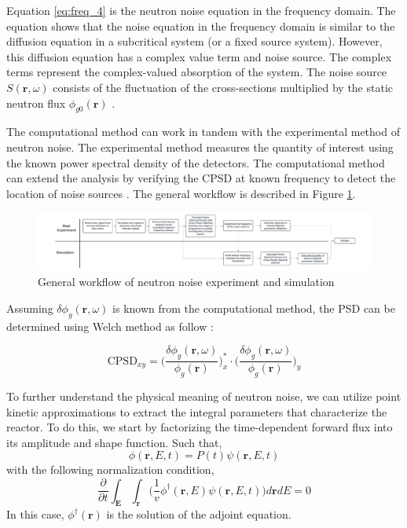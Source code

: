 Equation \ref{eq:freq_4} is the neutron noise equation in the frequency domain. The equation shows that the noise equation in the frequency domain is similar to the diffusion equation in a subcritical system (or a fixed source system). However, this diffusion equation has a complex value term and noise source. The complex terms represent the complex-valued absorption of the system. The noise source  $S (\textbf{r}, \omega)$ consists of the fluctuation of the cross-sections multiplied by the static neutron flux $\phi_{g0} (\textbf{r})$ \cite{pazsitDynamicAdjointGreen2015}. 

The computational method can work in tandem with the experimental method of neutron noise. The experimental method measures the quantity of interest using the known power spectral density of the detectors. The computational method can extend the analysis by verifying the CPSD at known frequency to detect the location of noise sources \cite{hursinModelingNoiseExperiments2023}. The general workflow is described in Figure \ref{fig:flow_diagram}.
\begin{figure}[h]
        \centering
        \includegraphics[width=\textwidth]{figures/ch1_Picture1.png}
        \caption{General workflow of neutron noise experiment and simulation}
        \label{fig:flow_diagram}
\end{figure}

Assuming $\delta \phi_g (\textbf{r},\omega)$ is known from the computational method, the PSD can be determined using Welch method as follow \cite{mylonakisCORESIMSIMULATIONS2021}:

\begin{equation}
        \text{CPSD}_{xy} = \biggl(\frac{\delta \phi_{g}(\textbf{r}, \omega)}{\phi_{g}(\textbf{r})} \biggr)_x^* \cdot \biggl(\frac{\delta \phi_{g}(\textbf{r}, \omega)}{\phi_{g}(\textbf{r})} \biggr)_y
        \label{eq:CPSD_comp}
\end{equation}

To further understand the physical meaning of neutron noise, we can utilize point kinetic approximations to extract the integral parameters that characterize the reactor. To do this, we start by factorizing the time-dependent forward flux into its amplitude and shape function. Such that,
\begin{equation}
        \phi (\textbf{r}, E, t) = P(t) \psi (\textbf{r}, E, t)
\end{equation}
with the following normalization condition,
\begin{equation}\label{eq:normalization}
        \frac{\partial}{\partial t} \int_{\textbf{E}} \int_{\textbf{r}} \biggl( \frac{1}{v} \phi^{\dagger}(\textbf{r}, E) \psi (\textbf{r}, E, t) \biggr) d\textbf{r} dE = 0
\end{equation}
In this case, $\phi^{\dagger}(\textbf{r})$ is the solution of the adjoint equation. 

